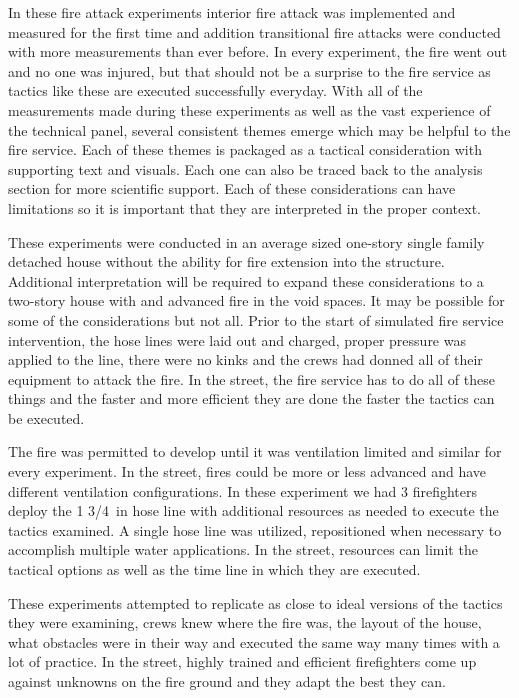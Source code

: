 \documentclass[12pt,oneside]{book}
\begin{document}
In these fire attack experiments interior fire attack was implemented and measured for the first time and addition transitional fire attacks were conducted with more measurements than ever before.  In every experiment, the fire went out and no one was injured, but that should not be a surprise to the fire service as tactics like these are executed successfully everyday.  With all of the measurements made during these experiments as well as the vast experience of the technical panel, several consistent themes emerge which may be helpful to the fire service. Each of these themes is packaged as a tactical consideration with supporting text and visuals. Each one can also be traced back to the analysis section for more scientific support. Each of these considerations can have limitations so it is important that they are interpreted in the proper context.  

These experiments were conducted in an average sized one-story single family detached house without the ability for fire extension into the structure.  Additional interpretation will be required to expand these considerations to a two-story house with and advanced fire in the void spaces. It may be possible for some of the considerations but not all.  Prior to the start of simulated fire service intervention, the hose lines were laid out and charged, proper pressure was applied to the line, there were no kinks and the crews had donned all of their equipment to attack the fire. In the street, the fire service has to do all of these things and the faster and more efficient they are done the faster the tactics can be executed. 

The fire was permitted to develop until it was ventilation limited and similar for every experiment. In the street, fires could be more or less advanced and have different ventilation configurations. In these experiment we had 3 firefighters deploy the 1 3/4~in hose line with additional resources as needed to execute the tactics examined. A single hose line was utilized, repositioned when necessary to accomplish multiple water applications. In the street, resources can limit the tactical options as well as the time line in which they are executed.  

These experiments attempted to replicate as close to ideal versions of the tactics they were examining, crews knew where the fire was, the layout of the house, what obstacles were in their way and executed the same way many times with a lot of practice. In the street, highly trained and efficient firefighters come up against unknowns on the fire ground and they adapt the best they can.
\end{document}
